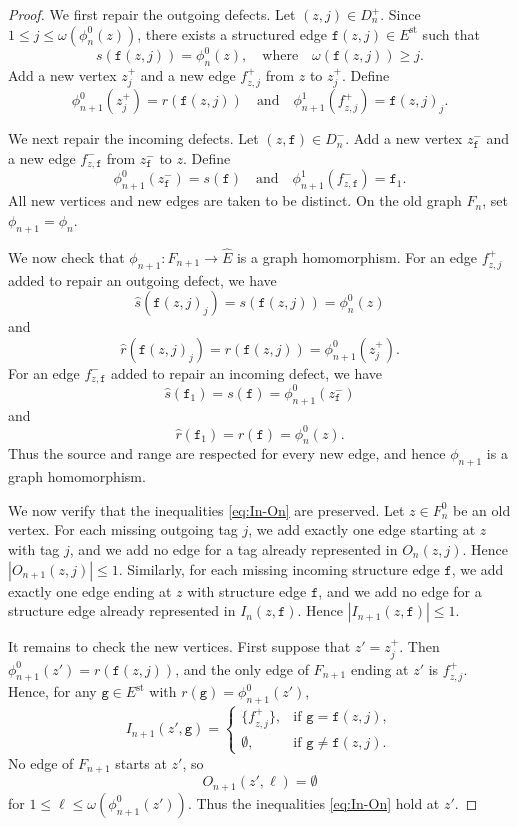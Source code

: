 \documentclass[10pt,a4paper]{amsart}
\begin{document}
\begin{proof}
We first repair the outgoing defects. Let $(z,j)\in D_n^+$. Since $1\leq j\leq \omega(\phi_n^0(z))$, there exists a structured edge $\mathtt{f}(z,j)\in E^{\mathrm{st}}$ such that
$$
s(\mathtt{f}(z,j))=\phi_n^0(z),\quad\text{where}\quad
\omega(\mathtt{f}(z,j))\geq j.
$$
Add a new vertex $z_j^+$ and a new edge $f_{z,j}^+$ from $z$ to $z_j^+$. Define
$$
\phi_{n+1}^0(z_j^+)=r(\mathtt{f}(z,j))\quad\text{and}\quad
\phi_{n+1}^1(f_{z,j}^+)=\mathtt{f}(z,j)_j.
$$

We next repair the incoming defects. Let $(z,\mathtt{f})\in D_n^-$. Add a new vertex $z_{\mathtt{f}}^-$ and a new edge $f_{z,\mathtt{f}}^-$ from $z_{\mathtt{f}}^-$ to $z$. Define
$$
\phi_{n+1}^0(z_{\mathtt{f}}^-)=s(\mathtt{f})\quad\text{and}\quad
\phi_{n+1}^1(f_{z,\mathtt{f}}^-)=\mathtt{f}_1.
$$
All new vertices and new edges are taken to be distinct. On the old graph $F_n$, set $\phi_{n+1}=\phi_n$.

We now check that $\phi_{n+1}:F_{n+1}\to\widehat E$ is a graph homomorphism. For an edge $f_{z,j}^+$ added to repair an outgoing defect, we have
$$
\widehat s(\mathtt{f}(z,j)_j)=s(\mathtt{f}(z,j))=\phi_n^0(z)
$$
and
$$
\widehat r(\mathtt{f}(z,j)_j)=r(\mathtt{f}(z,j))=\phi_{n+1}^0(z_j^+).
$$
For an edge $f_{z,\mathtt{f}}^-$ added to repair an incoming defect, we have
$$
\widehat s(\mathtt{f}_1)=s(\mathtt{f})=\phi_{n+1}^0(z_{\mathtt{f}}^-)
$$
and
$$
\widehat r(\mathtt{f}_1)=r(\mathtt{f})=\phi_n^0(z).
$$
Thus the source and range are respected for every new edge, and hence $\phi_{n+1}$ is a graph homomorphism.

We now verify that the inequalities \eqref{eq:In-On} are preserved. Let $z\in F_n^0$ be an old vertex. For each missing outgoing tag $j$, we add exactly one edge starting at $z$ with tag $j$, and we add no edge for a tag already represented in $O_n(z,j)$. Hence $|O_{n+1}(z,j)|\leq 1$. Similarly, for each missing incoming structure edge $\mathtt{f}$, we add exactly one edge ending at $z$ with structure edge $\mathtt{f}$, and we add no edge for a structure edge already represented in $I_n(z,\mathtt{f})$. Hence $|I_{n+1}(z,\mathtt{f})|\leq 1$.

It remains to check the new vertices. First suppose that $z'=z_j^+$. Then $\phi_{n+1}^0(z')=r(\mathtt{f}(z,j))$, and the only edge of $F_{n+1}$ ending at $z'$ is $f_{z,j}^+$. Hence, for any $\mathtt{g}\in E^{\mathrm{st}}$ with $r(\mathtt{g})=\phi_{n+1}^0(z')$,
$$
I_{n+1}(z',\mathtt{g})=
\begin{cases}
\{f_{z,j}^+\},&\text{if }\mathtt{g}=\mathtt{f}(z,j),\\
\emptyset,&\text{if }\mathtt{g}\neq \mathtt{f}(z,j).
\end{cases}
$$
No edge of $F_{n+1}$ starts at $z'$, so
$$
O_{n+1}(z',\ell)=\emptyset
$$
for $1\leq \ell\leq \omega(\phi_{n+1}^0(z'))$. Thus the inequalities \eqref{eq:In-On} hold at $z'$.


\end{proof}
\end{document}
